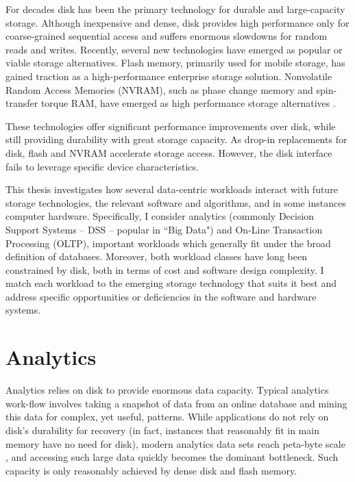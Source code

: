 For decades disk has been the primary technology for durable and large-capacity storage.
Although inexpensive and dense, disk provides high performance only for coarse-grained sequential access and suffers enormous slowdowns for random reads and writes.
Recently, several new technologies have emerged as popular or viable storage alternatives.
Flash memory, primarily used for mobile storage, has gained traction as a high-performance enterprise storage solution.
Nonvolatile Random Access Memories (NVRAM), such as phase change memory and spin-transfer torque RAM, have emerged as high performance storage alternatives \cite{BurrKurdi08}.

These technologies offer significant performance improvements over disk, while still providing durability with great storage capacity.
As drop-in replacements for disk, flash and NVRAM accelerate storage access.
However, the disk interface fails to leverage specific device characteristics.

This thesis investigates how several data-centric workloads interact with future storage technologies, the relevant software and algorithms, and in some instances computer hardware.
Specifically, I consider analytics (commonly Decision Support Systems -- DSS -- popular in ``Big Data") and On-Line Transaction Processing (OLTP), important workloads which generally fit under the broad definition of databases.
Moreover, both workload classes have long been constrained by disk, both in terms of cost and software design complexity.
I match each workload to the emerging storage technology that suits it best and address specific opportunities or deficiencies in the software and hardware systems.

\section{Analytics}
\label{sec:Intro:Analytics}

Analytics relies on disk to provide enormous data capacity.
Typical analytics work-flow involves taking a snapshot of data from an online database and mining this data for complex, yet useful, patterns.
While applications do not rely on disk's durability for recovery (in fact, instances that reasonably fit in main memory have no need for disk), modern analytics data sets reach peta-byte scale \cite{Economist10}, and accessing such large data quickly becomes the dominant bottleneck.
Such capacity is only reasonably achieved by dense disk and flash memory.

